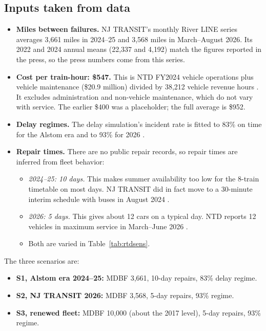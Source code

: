 \documentclass[11pt]{article}
\begin{document}
\subsection{Inputs taken from data}
\begin{itemize}
\item \textbf{Miles between failures.} NJ TRANSIT's monthly River LINE series \citep{njt_mdbf} averages 3{,}661 miles in 2024--25 and 3{,}568 miles in March--August 2026. Its 2022 and 2024 annual means (22{,}337 and 4{,}192) match the figures reported in the press, so the press numbers come from this series.
\item \textbf{Cost per train-hour: \$547.} This is NTD FY2024 vehicle operations plus vehicle maintenance (\$20.9 million) divided by 38{,}212 vehicle revenue hours \citep{ntd_ts21}. It excludes administration and non-vehicle maintenance, which do not vary with service. The earlier \$400 was a placeholder; the full average is \$952.
\item \textbf{Delay regimes.} The delay simulation's incident rate is fitted to 83\% on time for the Alstom era \citep{news12_2025,njtod2026} and to 93\% for 2026 \citep{ols2027njt}.
\item \textbf{Repair times.} There are no public repair records, so repair times are inferred from fleet behavior:
  \begin{itemize}
  \item \emph{2024--25: 10 days.} This makes summer availability too low for the 8-train timetable on most days. NJ TRANSIT did in fact move to a 30-minute interim schedule with buses in August 2024 \citep{njt2024interim}.
  \item \emph{2026: 5 days.} This gives about 12 cars on a typical day. NTD reports 12 vehicles in maximum service in March--June 2026 \citep{ntd_monthly}.
  \item Both are varied in Table~\ref{tab:rtdsens}.
  \end{itemize}
\end{itemize}
The three scenarios are:
\begin{itemize}
\item \textbf{S1, Alstom era 2024--25:} MDBF 3{,}661, 10-day repairs, 83\% delay regime.
\item \textbf{S2, NJ TRANSIT 2026:} MDBF 3{,}568, 5-day repairs, 93\% regime.
\item \textbf{S3, renewed fleet:} MDBF 10{,}000 (about the 2017 level), 5-day repairs, 93\% regime.
\end{itemize}
\end{document}
